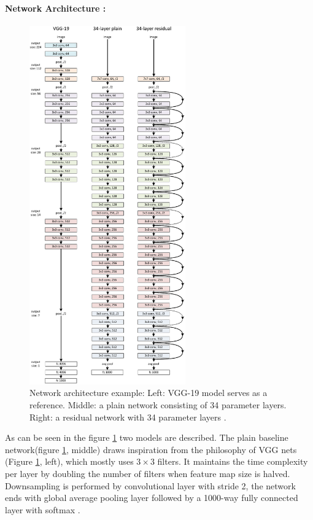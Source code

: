 \paragraph*{Network Architecture :}

\begin{figure}[H]
    \centering
    \includegraphics[width=0.6\textwidth]{Rohit_Master_Thesis//Images/resnet_arch.pdf}
    \caption{Network architecture example: Left: VGG-19 model serves as a reference. Middle: a plain network consisting of 34 parameter layers. Right: a residual network with 34 parameter layers \cite{he2016deep}.}
    \label{fig:resnet architecture}
\end{figure}

As can be seen in the figure \ref{fig:resnet architecture} two models are described. The plain baseline network(figure \ref{fig:resnet architecture}, middle) draws inspiration from the philosophy of VGG nets\cite{simonyan2015deepconvolutionalnetworkslargescale} (Figure \ref{fig:resnet architecture}, left), which mostly uses $3\times3$ filters. It maintains the time complexity per layer by doubling the number of filters when feature map size is halved. Downsampling is performed by convolutional layer with stride 2, the network ends with global average pooling layer followed by a 1000-way fully connected layer with softmax \cite{he2016deep}.

